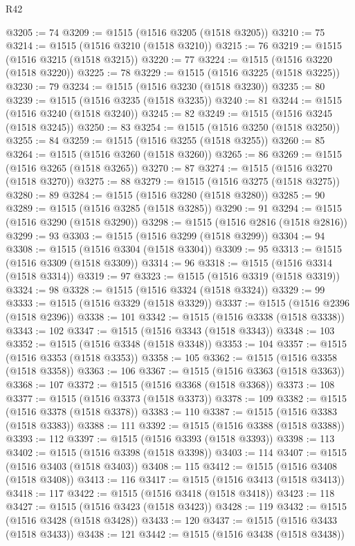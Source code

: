 \begin{lexlean}{R42}
\begin{coremodule}
{@3205 := 74
@3209 := @1515 (@1516 @3205 (@1518 @3205))
@3210 := 75
@3214 := @1515 (@1516 @3210 (@1518 @3210))
@3215 := 76
@3219 := @1515 (@1516 @3215 (@1518 @3215))
@3220 := 77
@3224 := @1515 (@1516 @3220 (@1518 @3220))
@3225 := 78
@3229 := @1515 (@1516 @3225 (@1518 @3225))
@3230 := 79
@3234 := @1515 (@1516 @3230 (@1518 @3230))
@3235 := 80
@3239 := @1515 (@1516 @3235 (@1518 @3235))
@3240 := 81
@3244 := @1515 (@1516 @3240 (@1518 @3240))
@3245 := 82
@3249 := @1515 (@1516 @3245 (@1518 @3245))
@3250 := 83
@3254 := @1515 (@1516 @3250 (@1518 @3250))
@3255 := 84
@3259 := @1515 (@1516 @3255 (@1518 @3255))
@3260 := 85
@3264 := @1515 (@1516 @3260 (@1518 @3260))
@3265 := 86
@3269 := @1515 (@1516 @3265 (@1518 @3265))
@3270 := 87
@3274 := @1515 (@1516 @3270 (@1518 @3270))
@3275 := 88
@3279 := @1515 (@1516 @3275 (@1518 @3275))
@3280 := 89
@3284 := @1515 (@1516 @3280 (@1518 @3280))
@3285 := 90
@3289 := @1515 (@1516 @3285 (@1518 @3285))
@3290 := 91
@3294 := @1515 (@1516 @3290 (@1518 @3290))
@3298 := @1515 (@1516 @2816 (@1518 @2816))
@3299 := 93
@3303 := @1515 (@1516 @3299 (@1518 @3299))
@3304 := 94
@3308 := @1515 (@1516 @3304 (@1518 @3304))
@3309 := 95
@3313 := @1515 (@1516 @3309 (@1518 @3309))
@3314 := 96
@3318 := @1515 (@1516 @3314 (@1518 @3314))
@3319 := 97
@3323 := @1515 (@1516 @3319 (@1518 @3319))
@3324 := 98
@3328 := @1515 (@1516 @3324 (@1518 @3324))
@3329 := 99
@3333 := @1515 (@1516 @3329 (@1518 @3329))
@3337 := @1515 (@1516 @2396 (@1518 @2396))
@3338 := 101
@3342 := @1515 (@1516 @3338 (@1518 @3338))
@3343 := 102
@3347 := @1515 (@1516 @3343 (@1518 @3343))
@3348 := 103
@3352 := @1515 (@1516 @3348 (@1518 @3348))
@3353 := 104
@3357 := @1515 (@1516 @3353 (@1518 @3353))
@3358 := 105
@3362 := @1515 (@1516 @3358 (@1518 @3358))
@3363 := 106
@3367 := @1515 (@1516 @3363 (@1518 @3363))
@3368 := 107
@3372 := @1515 (@1516 @3368 (@1518 @3368))
@3373 := 108
@3377 := @1515 (@1516 @3373 (@1518 @3373))
@3378 := 109
@3382 := @1515 (@1516 @3378 (@1518 @3378))
@3383 := 110
@3387 := @1515 (@1516 @3383 (@1518 @3383))
@3388 := 111
@3392 := @1515 (@1516 @3388 (@1518 @3388))
@3393 := 112
@3397 := @1515 (@1516 @3393 (@1518 @3393))
@3398 := 113
@3402 := @1515 (@1516 @3398 (@1518 @3398))
@3403 := 114
@3407 := @1515 (@1516 @3403 (@1518 @3403))
@3408 := 115
@3412 := @1515 (@1516 @3408 (@1518 @3408))
@3413 := 116
@3417 := @1515 (@1516 @3413 (@1518 @3413))
@3418 := 117
@3422 := @1515 (@1516 @3418 (@1518 @3418))
@3423 := 118
@3427 := @1515 (@1516 @3423 (@1518 @3423))
@3428 := 119
@3432 := @1515 (@1516 @3428 (@1518 @3428))
@3433 := 120
@3437 := @1515 (@1516 @3433 (@1518 @3433))
@3438 := 121
@3442 := @1515 (@1516 @3438 (@1518 @3438))
}
\end{coremodule}
\end{lexlean}
